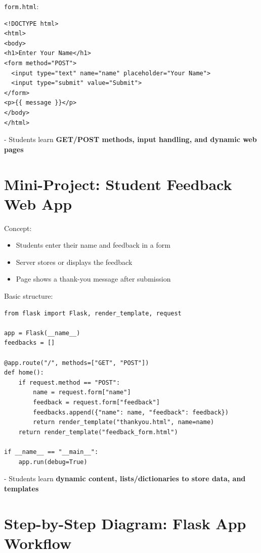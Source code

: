\texttt{form.html}:

\begin{verbatim}
<!DOCTYPE html>
<html>
<body>
<h1>Enter Your Name</h1>
<form method="POST">
  <input type="text" name="name" placeholder="Your Name">
  <input type="submit" value="Submit">
</form>
<p>{{ message }}</p>
</body>
</html>
\end{verbatim}

- Students learn \textbf{GET/POST methods, input handling, and dynamic web pages}  

\section{Mini-Project: Student Feedback Web App}

Concept:

\begin{itemize}
    \item Students enter their name and feedback in a form  
    \item Server stores or displays the feedback  
    \item Page shows a thank-you message after submission  
\end{itemize}

Basic structure:

\begin{verbatim}
from flask import Flask, render_template, request

app = Flask(__name__)
feedbacks = []

@app.route("/", methods=["GET", "POST"])
def home():
    if request.method == "POST":
        name = request.form["name"]
        feedback = request.form["feedback"]
        feedbacks.append({"name": name, "feedback": feedback})
        return render_template("thankyou.html", name=name)
    return render_template("feedback_form.html")

if __name__ == "__main__":
    app.run(debug=True)
\end{verbatim}

- Students learn \textbf{dynamic content, lists/dictionaries to store data, and templates}  

\section{Step-by-Step Diagram: Flask App Workflow}

